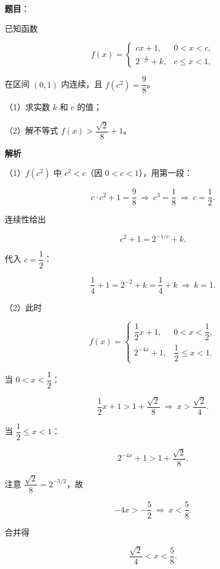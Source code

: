 \begin{answer}

\textbf{题目}：

已知函数

\nopagebreak[4]
\[f(x)=\begin{cases}cx+1,&0<x<c,\\ 2^{-\frac{x}{c^2}}+k,&c\leqslant x<1,\end{cases}\]

在区间 $(0,1)$ 内连续，且 $f(c^2)=\dfrac98$。

（1）求实数 $k$ 和 $c$ 的值；

（2）解不等式 $f(x)>\dfrac{\sqrt2}{8}+1$。

\textbf{解析}

（1）$f(c^2)$ 中 $c^2<c$（因 $0<c<1$），用第一段：

\nopagebreak[4]
\[c\cdot c^2+1=\frac98\ \Rightarrow\ c^3=\frac18\ \Rightarrow\ c=\frac12.\]

连续性给出

\nopagebreak[4]
\[c^2+1=2^{-1/c}+k.\]

代入 $c=\dfrac12$：

\nopagebreak[4]
\[\frac14+1=2^{-2}+k=\frac14+k\ \Rightarrow\ k=1.\]

（2）此时

\nopagebreak[4]
\[f(x)=\begin{cases}\dfrac12x+1,&0<x<\dfrac12,\\ 2^{-4x}+1,&\dfrac12\leqslant x<1.\end{cases}\]

当 $0<x<\dfrac12$：

\nopagebreak[4]
\[\frac12x+1>1+\frac{\sqrt2}{8}\ \Rightarrow\ x>\frac{\sqrt2}{4}.\]

当 $\dfrac12\leqslant x<1$：

\nopagebreak[4]
\[2^{-4x}+1>1+\frac{\sqrt2}{8}.\]

注意 $\dfrac{\sqrt2}{8}=2^{-5/2}$，故

\nopagebreak[4]
\[-4x>-\frac52\ \Rightarrow\ x<\frac58.\]

合并得

\nopagebreak[4]
\[\frac{\sqrt2}{4}<x<\frac58.\]


\end{answer}

